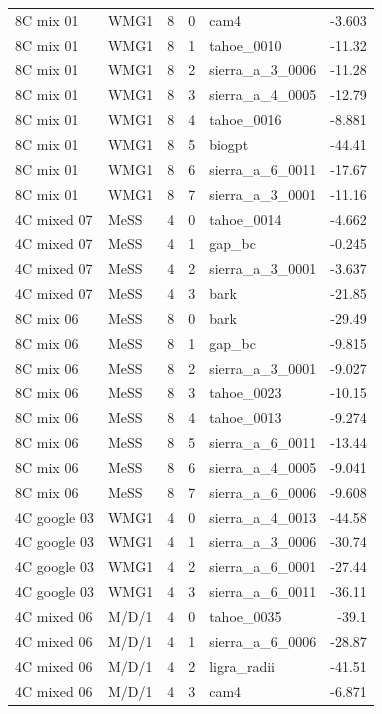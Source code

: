 \begin{tabular}{llrrlr}
8C mix 01 & WMG1 & 8 & 0 & cam4 & -3.603 \\
8C mix 01 & WMG1 & 8 & 1 & tahoe\_0010 & -11.32 \\
8C mix 01 & WMG1 & 8 & 2 & sierra\_a\_3\_0006 & -11.28 \\
8C mix 01 & WMG1 & 8 & 3 & sierra\_a\_4\_0005 & -12.79 \\
8C mix 01 & WMG1 & 8 & 4 & tahoe\_0016 & -8.881 \\
8C mix 01 & WMG1 & 8 & 5 & biogpt & -44.41 \\
8C mix 01 & WMG1 & 8 & 6 & sierra\_a\_6\_0011 & -17.67 \\
8C mix 01 & WMG1 & 8 & 7 & sierra\_a\_3\_0001 & -11.16 \\
4C mixed 07 & MeSS & 4 & 0 & tahoe\_0014 & -4.662 \\
4C mixed 07 & MeSS & 4 & 1 & gap\_bc & -0.245 \\
4C mixed 07 & MeSS & 4 & 2 & sierra\_a\_3\_0001 & -3.637 \\
4C mixed 07 & MeSS & 4 & 3 & bark & -21.85 \\
8C mix 06 & MeSS & 8 & 0 & bark & -29.49 \\
8C mix 06 & MeSS & 8 & 1 & gap\_bc & -9.815 \\
8C mix 06 & MeSS & 8 & 2 & sierra\_a\_3\_0001 & -9.027 \\
8C mix 06 & MeSS & 8 & 3 & tahoe\_0023 & -10.15 \\
8C mix 06 & MeSS & 8 & 4 & tahoe\_0013 & -9.274 \\
8C mix 06 & MeSS & 8 & 5 & sierra\_a\_6\_0011 & -13.44 \\
8C mix 06 & MeSS & 8 & 6 & sierra\_a\_4\_0005 & -9.041 \\
8C mix 06 & MeSS & 8 & 7 & sierra\_a\_6\_0006 & -9.608 \\
4C google 03 & WMG1 & 4 & 0 & sierra\_a\_4\_0013 & -44.58 \\
4C google 03 & WMG1 & 4 & 1 & sierra\_a\_3\_0006 & -30.74 \\
4C google 03 & WMG1 & 4 & 2 & sierra\_a\_6\_0001 & -27.44 \\
4C google 03 & WMG1 & 4 & 3 & sierra\_a\_6\_0011 & -36.11 \\
4C mixed 06 & M/D/1 & 4 & 0 & tahoe\_0035 & -39.1 \\
4C mixed 06 & M/D/1 & 4 & 1 & sierra\_a\_6\_0006 & -28.87 \\
4C mixed 06 & M/D/1 & 4 & 2 & ligra\_radii & -41.51 \\
4C mixed 06 & M/D/1 & 4 & 3 & cam4 & -6.871 \\

\end{tabular}
